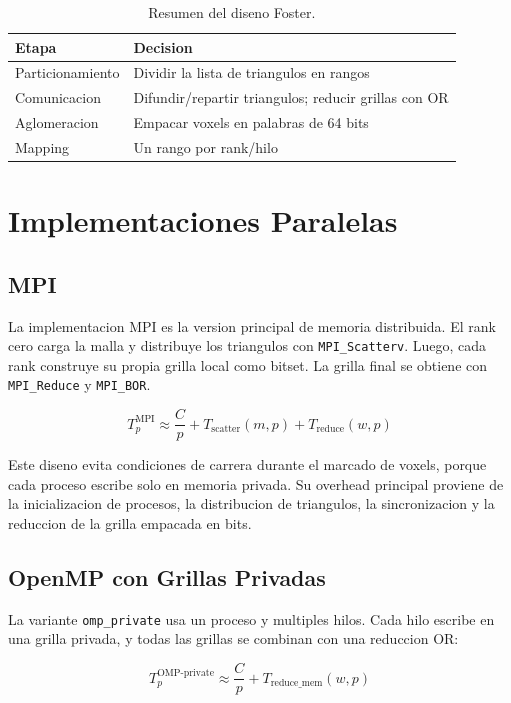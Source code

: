 \documentclass[conference]{IEEEtran}
\begin{document}
\begin{table}[t]
    \centering
    \caption{Resumen del diseno Foster.}
    \begin{tabular}{ll}
        \toprule
        Etapa & Decision \\
        \midrule
        Particionamiento & Dividir la lista de triangulos en rangos \\
        Comunicacion & Difundir/repartir triangulos; reducir grillas con OR \\
        Aglomeracion & Empacar voxels en palabras de 64 bits \\
        Mapping & Un rango por rank/hilo \\
        \bottomrule
    \end{tabular}
\end{table}

\section{Implementaciones Paralelas}

\subsection{MPI}

La implementacion MPI es la version principal de memoria distribuida. El rank
cero carga la malla y distribuye los triangulos con \texttt{MPI\_Scatterv}.
Luego, cada rank construye su propia grilla local como bitset. La grilla final
se obtiene con \texttt{MPI\_Reduce} y \texttt{MPI\_BOR}.

\[
    T_p^{\text{MPI}} \approx \frac{C}{p} + T_{\text{scatter}}(m,p) + T_{\text{reduce}}(w,p)
\]

Este diseno evita condiciones de carrera durante el marcado de voxels, porque
cada proceso escribe solo en memoria privada. Su overhead principal proviene de
la inicializacion de procesos, la distribucion de triangulos, la sincronizacion y
la reduccion de la grilla empacada en bits.

\subsection{OpenMP con Grillas Privadas}

La variante \texttt{omp\_private} usa un proceso y multiples hilos. Cada hilo
escribe en una grilla privada, y todas las grillas se combinan con una reduccion
OR:

\[
    T_p^{\text{OMP-private}} \approx \frac{C}{p} + T_{\text{reduce\_mem}}(w,p)
\]
\end{document}
